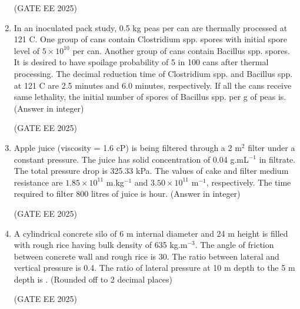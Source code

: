 \documentclass[journal,12pt,onecolumn]{IEEEtran}
\theoremstyle{remark}
\begin{document}
\begin{enumerate}
\hfill(GATE EE 2025)

\item In an inoculated pack study, 0.5 kg peas per can are thermally processed at 121 {\degree}C. One group of cans contain Clostridium spp. spores with initial spore level of $5 \times 10^{10}$ per can. Another group of cans contain Bacillus spp. spores. It is desired to have spoilage probability of 5 in 100 cans after thermal processing. The decimal reduction time of Clostridium spp. and Bacillus spp. at 121 {\degree}C are 2.5 minutes and 6.0 minutes, respectively. If all the cans receive same lethality, the initial number of spores of Bacillus spp. per g of peas is\underline{\hspace{2cm}}. (Answer in integer)

\hfill(GATE EE 2025)

\item Apple juice (viscosity = 1.6 cP) is being filtered through a 2 m$^2$ filter under a constant pressure. The juice has solid concentration of 0.04 g.mL$^{-1}$ in filtrate. The total pressure drop is 325.33 kPa. The values of cake and filter medium resistance are $1.85 \times 10^{11}$ m.kg$^{-1}$ and $3.50 \times 10^{11}$ m$^{-1}$, respectively. The time required to filter 800 litres of juice is\underline{\hspace{2cm}} hour. (Answer in integer)

\hfill(GATE EE 2025)

\item A cylindrical concrete silo of 6 m internal diameter and 24 m height is filled with rough rice having bulk density of 635 kg.m$^{-3}$. The angle of friction between concrete wall and rough rice is 30{\degree}. The ratio between lateral and vertical pressure is 0.4. The ratio of lateral pressure at 10 m depth to the 5 m depth is \underline{\hspace{2cm}}. (Rounded off to 2 decimal places)

\hfill(GATE EE 2025)

\end{enumerate}
\end{document}
